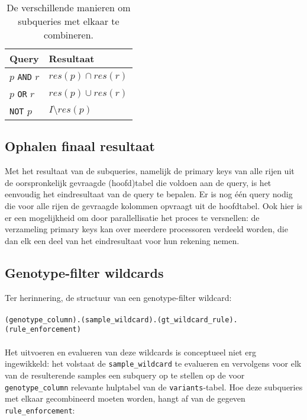 \begin{table}[h]
\centering
\begin{tabular}{|l|l|}
\hline
\textbf{Query} & \textbf{Resultaat}    \\ \hline
$p$ \texttt{AND} $r$ & $res(p) \cap res(r)$   \\ \hline
$p$ \texttt{OR} $r$ & $res(p) \cup res(r)$    \\ \hline
\texttt{NOT} $p$  & $I \setminus res(p)$ \\ \hline
\end{tabular}
\caption{De verschillende manieren om subqueries met elkaar te combineren.}
\label{combineren_subqueries}
\end{table}

\subsection{Ophalen finaal resultaat}

Met het resultaat van de subqueries, namelijk de primary keys van alle rijen uit de oorspronkelijk gevraagde (hoofd)tabel die voldoen aan de query, is het eenvoudig het eindresultaat van de query te bepalen. Er is nog \'e\'en query nodig die voor alle rijen de gevraagde kolommen opvraagt uit de hoofdtabel. Ook hier is er een mogelijkheid om door parallellisatie het proces te versnellen: de verzameling primary keys kan over meerdere processoren verdeeld worden, die dan elk een deel van het eindresultaat voor hun rekening nemen. 

\subsection{Genotype-filter wildcards}

Ter herinnering, de structuur van een genotype-filter wildcard:\\\\
\texttt{(genotype\_column).(sample\_wildcard).(gt\_wildcard\_rule).(rule\_enforcement)}\\\\
Het uitvoeren en evalueren van deze wildcards is conceptueel niet erg ingewikkeld: het volstaat de \texttt{sample\_wildcard} te evalueren en vervolgens voor elk van de resulterende samples een subquery op te stellen op de voor \texttt{genotype\_column} relevante hulptabel van de \texttt{variants}-tabel. Hoe deze subqueries met elkaar gecombineerd moeten worden, hangt af van de gegeven \texttt{rule\_enforcement}:

